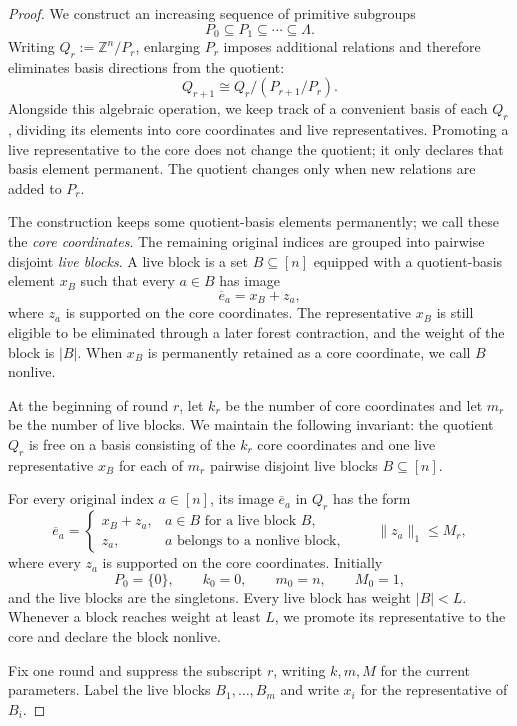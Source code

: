 \documentclass[10pt]{article}
\theoremstyle{definition}
\begin{document}
\begin{proof}
We construct an increasing sequence of primitive subgroups
\[
    P_0\subseteq P_1\subseteq\cdots\subseteq\Lambda.
\]
Writing $Q_r:=\mathbb Z^n/P_r$, enlarging $P_r$ imposes additional relations
and therefore eliminates basis directions from the quotient:
\[
    Q_{r+1}\cong Q_r/(P_{r+1}/P_r).
\]
Alongside this algebraic operation, we keep track of a convenient basis of
each $Q_r$, dividing its elements into core coordinates and live
representatives.  Promoting a live representative to the core does not
change the quotient; it only declares that basis element permanent.  The
quotient changes only when new relations are added to $P_r$.

The construction keeps some quotient-basis elements permanently; we call
these the \emph{core coordinates}.  The remaining original indices are
grouped into pairwise disjoint \emph{live blocks}.  A live block is a set
$B\subseteq[n]$ equipped with a quotient-basis element $x_B$ such that every
$a\in B$ has image
\[
    \overline e_a=x_B+z_a,
\]
where $z_a$ is supported on the core coordinates.  The representative $x_B$
is still eligible to be eliminated through a later forest contraction, and
the weight of the block is $|B|$.  When $x_B$ is permanently retained as a
core coordinate, we call $B$ nonlive.

At the beginning of round $r$, let $k_r$ be the number of core coordinates
and let $m_r$ be the number of live blocks.  We maintain the following
invariant: the quotient $Q_r$ is free on a basis consisting of the $k_r$
core coordinates and one live
representative $x_B$ for each of $m_r$ pairwise disjoint live blocks
$B\subseteq[n]$.

For every original index $a\in[n]$, its image $\overline e_a$ in $Q_r$ has
the form
\[
    \overline e_a=
    \begin{cases}
        x_B+z_a, & a\in B\text{ for a live block }B,\\
        z_a,     & a\text{ belongs to a nonlive block},
    \end{cases}
    \qquad
    \|z_a\|_1\le M_r,
\]
where every $z_a$ is supported on the core coordinates.  Initially
\[
    P_0=\{0\},\qquad k_0=0,\qquad m_0=n,\qquad M_0=1,
\]
and the live blocks are the singletons.  Every live block has weight
$|B|<L$.  Whenever a block reaches weight at least $L$, we promote its
representative to the core and declare the block nonlive.

Fix one round and suppress the subscript $r$, writing $k,m,M$ for the current
parameters.  Label the live blocks $B_1,\ldots,B_m$ and write $x_i$ for the
representative of $B_i$.


\end{proof}
\end{document}
